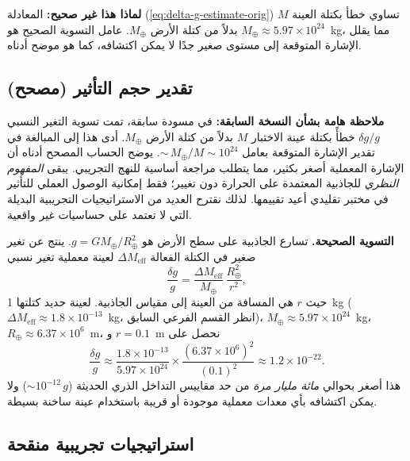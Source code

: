 \documentclass[11pt,a4paper]{article}
\begin{document}
	\textbf{لماذا هذا غير صحيح:} المعادلة (\ref{eq:delta-g-estimate-orig}) تساوي خطأ بكتلة العينة $M$ بدلاً من كتلة الأرض $M_\oplus$. عامل التسوية الصحيح هو $M_\oplus \approx 5.97\times10^{24}$~kg، مما يقلل الإشارة المتوقعة إلى مستوى صغير جدًا لا يمكن اكتشافه، كما هو موضح أدناه.
	
	\subsection{تقدير حجم التأثير (مصحح)}
	\label{subsec:lab-estimate-corrected}
	
	\textbf{ملاحظة هامة بشأن النسخة السابقة:} في مسودة سابقة، تمت تسوية التغير النسبي $\delta g/g$ خطأً بكتلة عينة الاختبار $M$ بدلاً من كتلة الأرض $M_\oplus$. أدى هذا إلى المبالغة في تقدير الإشارة المتوقعة بعامل ${\sim}\, M_\oplus/M \sim 10^{24}$. يوضح الحساب المصحح أدناه أن الإشارة المعملية أصغر بكثير، مما يتطلب مراجعة أساسية للنهج التجريبي. يبقى \emph{المفهوم النظري} للجاذبية المعتمدة على الحرارة دون تغيير؛ فقط إمكانية الوصول العملي للتأثير في مختبر تقليدي أعيد تقييمها. لذلك نقترح العديد من الاستراتيجيات التجريبية البديلة التي لا تعتمد على حساسيات غير واقعية.
	
	\textbf{التسوية الصحيحة.} تسارع الجاذبية على سطح الأرض هو $g = G M_\oplus / R_\oplus^2$. ينتج عن تغير صغير في الكتلة الفعالة $\Delta M_{\mathrm{eff}}$ لعينة معملية تغير نسبي
	\begin{equation}
		\frac{\delta g}{g} = \frac{\Delta M_{\mathrm{eff}}}{M_\oplus}\,
		\frac{R_\oplus^2}{r^2},
		\label{eq:delta-g-correct}
	\end{equation}
	حيث $r$ هي المسافة من العينة إلى مقياس الجاذبية. لعينة حديد كتلتها 1~kg ($\Delta M_{\mathrm{eff}} \approx 1.8\times10^{-13}$~kg، انظر القسم الفرعي السابق)، $M_\oplus \approx 5.97\times10^{24}$~kg، $R_\oplus \approx 6.37\times10^{6}$~m، و $r = 0.1$~m نحصل على
	\[
	\frac{\delta g}{g} \approx
	\frac{1.8\times10^{-13}}{5.97\times10^{24}} \times
	\frac{(6.37\times10^{6})^2}{(0.1)^2}
	\approx 1.2\times10^{-22}.
	\]
	هذا أصغر بحوالي \emph{مائة مليار مرة} من حد مقاييس التداخل الذري الحديثة ($\sim 10^{-12}\,g$) ولا يمكن اكتشافه بأي معدات معملية موجودة أو قريبة باستخدام عينة ساخنة بسيطة.
	
	\subsection{استراتيجيات تجريبية منقحة}
	\label{subsec:lab-revised}
	
\end{document}
